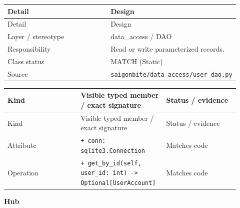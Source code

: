 \begin{longtable}{>{\raggedright\arraybackslash}p{0.4600\linewidth}>{\raggedright\arraybackslash}p{0.4600\linewidth}}
Detail & Design \\
\hline\endfirsthead
Detail & Design \\
\hline\endhead
Layer / stereotype & data\_access / \guillemotleft{}DAO\guillemotright{} \\
Responsibility & Read or write parameterized records. \\
Class status & MATCH (Static) \\
Source & \texttt{saigonbite/\allowbreak{}data\_\allowbreak{}access/\allowbreak{}user\_\allowbreak{}dao.\allowbreak{}py} \\
\end{longtable}
\begin{longtable}{>{\raggedright\arraybackslash}p{0.3067\linewidth}>{\raggedright\arraybackslash}p{0.3067\linewidth}>{\raggedright\arraybackslash}p{0.3067\linewidth}}
Kind & Visible typed member / exact signature & Status / evidence \\
\hline\endfirsthead
Kind & Visible typed member / exact signature & Status / evidence \\
\hline\endhead
Attribute & \texttt{+ conn: sqlite3.\allowbreak{}Connection} & Matches code \\
Operation & \texttt{+ get\_\allowbreak{}by\_\allowbreak{}id(self, user\_\allowbreak{}id: int) -\textgreater{} Optional[UserAccount]} & Matches code \\
\end{longtable}
\textbf{Hub}

